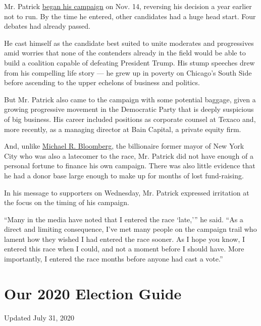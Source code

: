 Mr. Patrick
\href{https://www.nytimes.com/2019/11/14/us/politics/deval-patrick-2020-president.html}{began
his campaign} on Nov. 14, reversing his decision a year earlier not to
run. By the time he entered, other candidates had a huge head start.
Four debates had already passed.

He cast himself as the candidate best suited to unite moderates and
progressives amid worries that none of the contenders already in the
field would be able to build a coalition capable of defeating President
Trump. His stump speeches drew from his compelling life story --- he
grew up in poverty on Chicago's South Side before ascending to the upper
echelons of business and politics.

But Mr. Patrick also came to the campaign with some potential baggage,
given a growing progressive movement in the Democratic Party that is
deeply suspicious of big business. His career included positions as
corporate counsel at Texaco and, more recently, as a managing director
at Bain Capital, a private equity firm.

And, unlike
\href{https://www.nytimes.com/interactive/2020/us/elections/michael-bloomberg.html}{Michael
R. Bloomberg}, the billionaire former mayor of New York City who was
also a latecomer to the race, Mr. Patrick did not have enough of a
personal fortune to finance his own campaign. There was also little
evidence that he had a donor base large enough to make up for months of
lost fund-raising.

In his message to supporters on Wednesday, Mr. Patrick expressed
irritation at the focus on the timing of his campaign.

``Many in the media have noted that I entered the race `late,''' he
said. ``As a direct and limiting consequence, I've met many people on
the campaign trail who lament how they wished I had entered the race
sooner. As I hope you know, I entered this race when I could, and not a
moment before I should have. More importantly, I entered the race months
before anyone had cast a vote.''

\hypertarget{our-2020-election-guide}{%
\section{Our 2020 Election Guide}\label{our-2020-election-guide}}

Updated July 31, 2020

